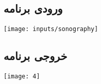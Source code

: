 \documentclass[12pt]{article}
\begin{document}
		\subsection{ورودی برنامه}
		\texttt{[image: inputs/sonography]}
		\subsection{خروجی برنامه}
		\texttt{[image: 4]}
\end{document}
